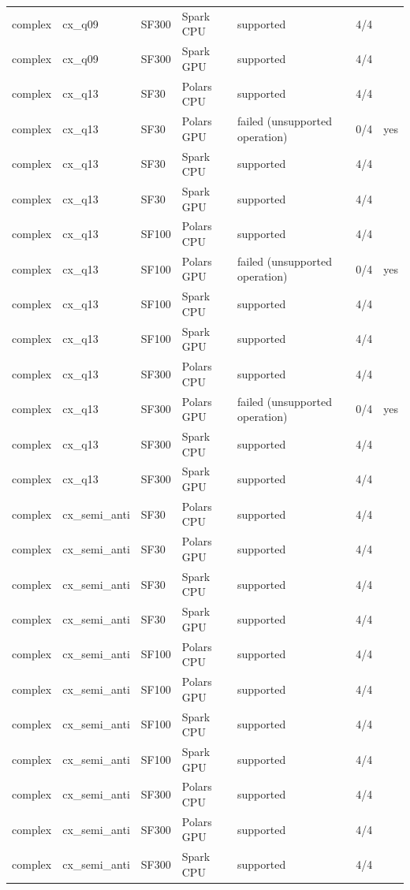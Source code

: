 \begin{longtable}{lllllll}
complex & cx\_q09 & SF300 & Spark CPU & supported & 4/4 &  \\
complex & cx\_q09 & SF300 & Spark GPU & supported & 4/4 &  \\
complex & cx\_q13 & SF30 & Polars CPU & supported & 4/4 &  \\
complex & cx\_q13 & SF30 & Polars GPU & failed (unsupported operation) & 0/4 & yes \\
complex & cx\_q13 & SF30 & Spark CPU & supported & 4/4 &  \\
complex & cx\_q13 & SF30 & Spark GPU & supported & 4/4 &  \\
complex & cx\_q13 & SF100 & Polars CPU & supported & 4/4 &  \\
complex & cx\_q13 & SF100 & Polars GPU & failed (unsupported operation) & 0/4 & yes \\
complex & cx\_q13 & SF100 & Spark CPU & supported & 4/4 &  \\
complex & cx\_q13 & SF100 & Spark GPU & supported & 4/4 &  \\
complex & cx\_q13 & SF300 & Polars CPU & supported & 4/4 &  \\
complex & cx\_q13 & SF300 & Polars GPU & failed (unsupported operation) & 0/4 & yes \\
complex & cx\_q13 & SF300 & Spark CPU & supported & 4/4 &  \\
complex & cx\_q13 & SF300 & Spark GPU & supported & 4/4 &  \\
complex & cx\_semi\_anti & SF30 & Polars CPU & supported & 4/4 &  \\
complex & cx\_semi\_anti & SF30 & Polars GPU & supported & 4/4 &  \\
complex & cx\_semi\_anti & SF30 & Spark CPU & supported & 4/4 &  \\
complex & cx\_semi\_anti & SF30 & Spark GPU & supported & 4/4 &  \\
complex & cx\_semi\_anti & SF100 & Polars CPU & supported & 4/4 &  \\
complex & cx\_semi\_anti & SF100 & Polars GPU & supported & 4/4 &  \\
complex & cx\_semi\_anti & SF100 & Spark CPU & supported & 4/4 &  \\
complex & cx\_semi\_anti & SF100 & Spark GPU & supported & 4/4 &  \\
complex & cx\_semi\_anti & SF300 & Polars CPU & supported & 4/4 &  \\
complex & cx\_semi\_anti & SF300 & Polars GPU & supported & 4/4 &  \\
complex & cx\_semi\_anti & SF300 & Spark CPU & supported & 4/4 &  \\

\end{longtable}
